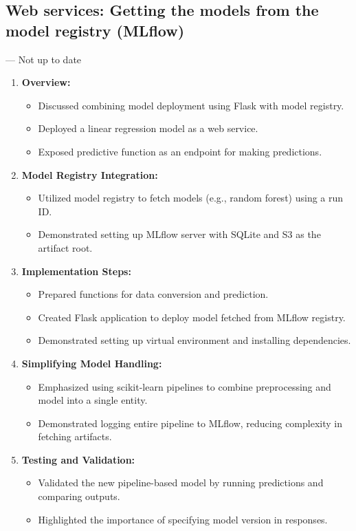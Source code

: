 \documentclass[letterpaper,12pt,notitlepage,twoside]{report}
\begin{document}
\subsection{Web services: Getting the models from the model registry (MLflow)} --- Not up to date
\begin{enumerate}
    \item \textbf{Overview:}
    \begin{itemize}
        \item Discussed combining model deployment using Flask with model registry.
        \item Deployed a linear regression model as a web service.
        \item Exposed predictive function as an endpoint for making predictions.
    \end{itemize}
    
    \item \textbf{Model Registry Integration:}
    \begin{itemize}
        \item Utilized model registry to fetch models (e.g., random forest) using a run ID.
        \item Demonstrated setting up MLflow server with SQLite and S3 as the artifact root.
    \end{itemize}
    
    \item \textbf{Implementation Steps:}
    \begin{itemize}
        \item Prepared functions for data conversion and prediction.
        \item Created Flask application to deploy model fetched from MLflow registry.
        \item Demonstrated setting up virtual environment and installing dependencies.
    \end{itemize}
    
    \item \textbf{Simplifying Model Handling:}
    \begin{itemize}
        \item Emphasized using scikit-learn pipelines to combine preprocessing and model into a single entity.
        \item Demonstrated logging entire pipeline to MLflow, reducing complexity in fetching artifacts.
    \end{itemize}
    
    \item \textbf{Testing and Validation:}
    \begin{itemize}
        \item Validated the new pipeline-based model by running predictions and comparing outputs.
        \item Highlighted the importance of specifying model version in responses.
    \end{itemize}
    

\end{enumerate}
\end{document}
